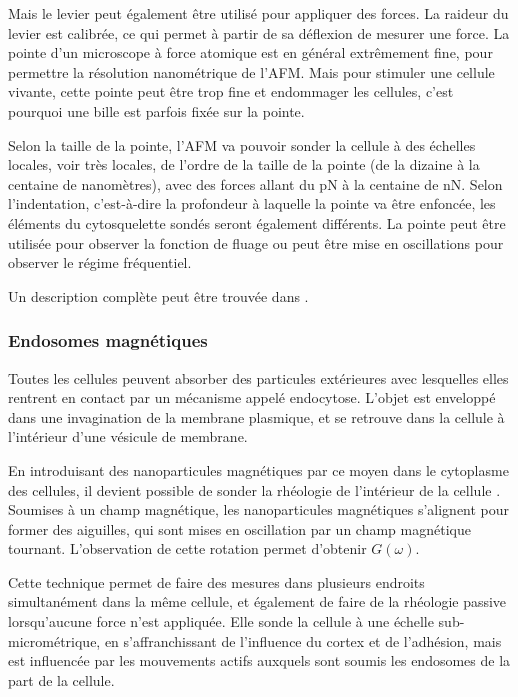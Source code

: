 \documentclass{report}
\begin{document}
Mais le levier peut également être utilisé pour appliquer des forces. La raideur du levier est calibrée, ce qui permet à partir de sa déflexion de mesurer une force. 
La pointe d'un microscope à force atomique est en général extrêmement fine, pour permettre la résolution nanométrique de l'AFM. Mais pour stimuler une cellule vivante, cette pointe peut être trop fine et endommager les cellules, c'est pourquoi une bille est parfois fixée sur la pointe.

Selon la taille de la pointe, l'AFM va pouvoir sonder la cellule à des échelles locales, voir très locales, de l'ordre de la taille de la pointe (de la dizaine à la centaine de nanomètres), avec des forces allant du pN à la centaine de nN. Selon l'indentation, c'est-à-dire la profondeur à laquelle la pointe va être enfoncée, les éléments du cytosquelette sondés seront également différents. 
La pointe peut être utilisée pour observer la fonction de fluage ou peut être mise en oscillations pour observer le régime fréquentiel. 

Un description complète peut être trouvée dans \cite{gautier}. 

\subsubsection{Endosomes magnétiques}

Toutes les cellules peuvent absorber des particules extérieures avec lesquelles elles rentrent en contact par un mécanisme appelé endocytose. L'objet est enveloppé dans une invagination de la membrane plasmique, et se retrouve dans la cellule à l'intérieur d'une vésicule de membrane. 

En introduisant des nanoparticules magnétiques par ce moyen dans le cytoplasme des cellules, il devient possible de sonder la rhéologie de l'intérieur de la cellule \cite{robert}. 
Soumises à un champ magnétique, les nanoparticules magnétiques s'alignent pour former des aiguilles, qui sont mises en oscillation par un champ magnétique tournant. 
L'observation de cette rotation permet d'obtenir $G(\omega)$. 

Cette technique permet de faire des mesures dans plusieurs endroits  simultanément dans la même cellule, et également de faire de la rhéologie passive lorsqu'aucune force n'est appliquée. Elle sonde la cellule à une échelle sub-micrométrique, en s'affranchissant de l'influence du cortex et de l'adhésion, mais est influencée par les mouvements actifs auxquels sont soumis les endosomes de la part de la cellule. 
\end{document}

